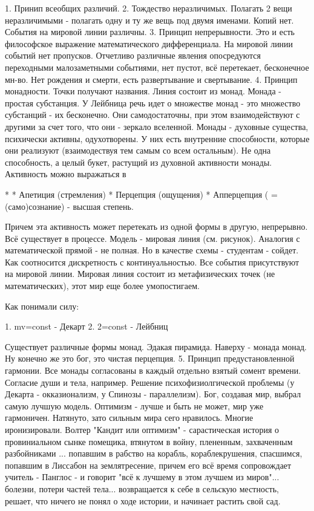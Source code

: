 1. Принип всеобщих различий. 
2. Тождество неразличимых. Полагать 2 вещи неразличимыми - полагать одну и ту же вещь под двумя именами. Копий нет. События на мировой линии различны. 
3. Принцип непрерывности. Это и есть философское выражение математического дифференциала. На мировой линии событий нет пропусков. Отчетливо различные явления опосредуются переходными малозаметными событиями, нет пустот, всё перетекает, бесконечное мн-во. Нет рождения и смерти, есть развертывание и свертывание. 
4. Принцип монадности. Точки получают названия. Линия состоит из монад. Монада - простая субстанция. У Лейбница речь идет о множестве монад - это множество субстанций - их бесконечно. Они самодостаточны, при этом взаимодействуют с другими за счет того, что они - зеркало вселенной. Монады - духовные существа, психически активны, одухотворены. У них есть внутренние способности, которые они реализуют (взаимодествуя тем самым со всем остальным). Не одна способность, а целый букет, растущий из духовной активности монады. Активность можно выражаться в 

	* 
		* Апетиция (стремления)
		* Перцепция (ощущения)
		* Апперцепция ( =(само)сознание) - высшая степень.


Причем эта активность может перетекать из одной формы в другую, непрерывно. 
Всё существует в процессе. 
Модель - мировая линия (см. рисунок). Аналогия с математической прямой - не полная. Но в качестве схемы - студентам - сойдет. Как соотносится дискретность с континуальностью. Все события присутствуют на мировой линии. Мировая линия состоит из метафизических точек (не математических), этот мир еще более умопостигаем.

Как понимали силу:

	1. mv=const - Декарт
	2. 2=const - Лейбниц


Существует различные формы монад. Эдакая пирамида. Наверху - монада монад. Ну конечно же это бог, это чистая перцепция. 
5. Принцип предустановленной гармонии. Все монады согласованы в каждый отдельно взятый сомент времени. Согласие души и тела, например. Решение психофизиолгической проблемы (у Декарта - окказионализм, у Спинозы - параллелизм). Бог, создавая мир, выбрал самую лучшую модель. Оптимизм - лучше и быть не может, мир уже гармоничен. Натянуто, зато сильным мира сего нравилось. Многие иронизировали. Волтер "Кандит или оптимизм" - сарастическая история о провиниальном сынке помещика, втянутом в войну, плененным, захваченным разбойниками ... попавшим в рабство на корабль, кораблекрушения, спасшимся, попавшим в Лиссабон на землятресение, причем его всё время сопровождает учитель - Панглос - и говорит "всё к лучшему в этом лучшем из миров"... болезни, потери частей тела... возвращается к себе в сельскую местность, решает, что ничего не понял о ходе истории, и начинает растить свой сад.

